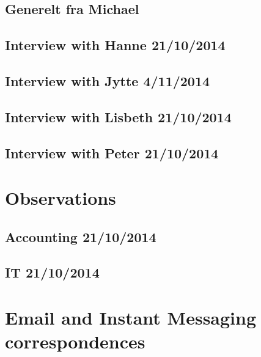 \section{Generelt fra Michael}

\section{Interview with Hanne 21/10/2014}

\section{Interview with Jytte 4/11/2014}

\section{Interview with Lisbeth 21/10/2014}

\section{Interview with Peter 21/10/2014}


\chapter{Observations}
\section{Accounting 21/10/2014}

\section{IT 21/10/2014}


\chapter{Email and Instant Messaging correspondences}
